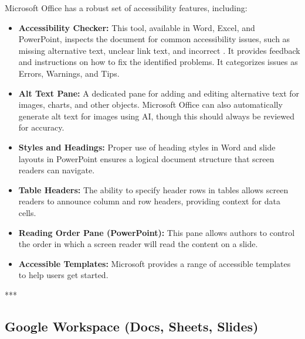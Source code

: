 Microsoft Office has a robust set of accessibility features, including\supercite{MicrosoftAccessibility}:
\begin{itemize}
	\item \textbf{Accessibility Checker:} This tool, available in Word, Excel, and PowerPoint, inspects the document for common accessibility issues, such as missing alternative text, unclear link text, and incorrect . It provides feedback and instructions on how to fix the identified problems. It categorizes issues as Errors, Warnings, and Tips.
	\item \textbf{Alt Text Pane:} A dedicated pane for adding and editing alternative text for images, charts, and other objects. Microsoft Office can also automatically generate alt text for images using AI, though this should always be reviewed for accuracy.
	\item \textbf{Styles and Headings:} Proper use of heading styles in Word and slide layouts in PowerPoint ensures a logical document structure that screen readers can navigate.
	\item \textbf{Table Headers:} The ability to specify header rows in tables allows screen readers to announce column and row headers, providing context for data cells.
	\item \textbf{Reading Order Pane (PowerPoint):} This pane allows authors to control the order in which a screen reader will read the content on a slide.
	\item \textbf{Accessible Templates:} Microsoft provides a range of accessible templates to help users get started.
\end{itemize}

***

\subsection{Google Workspace (Docs, Sheets, Slides)}
\label{sub:google-workspace-docs-sheets-slides}

